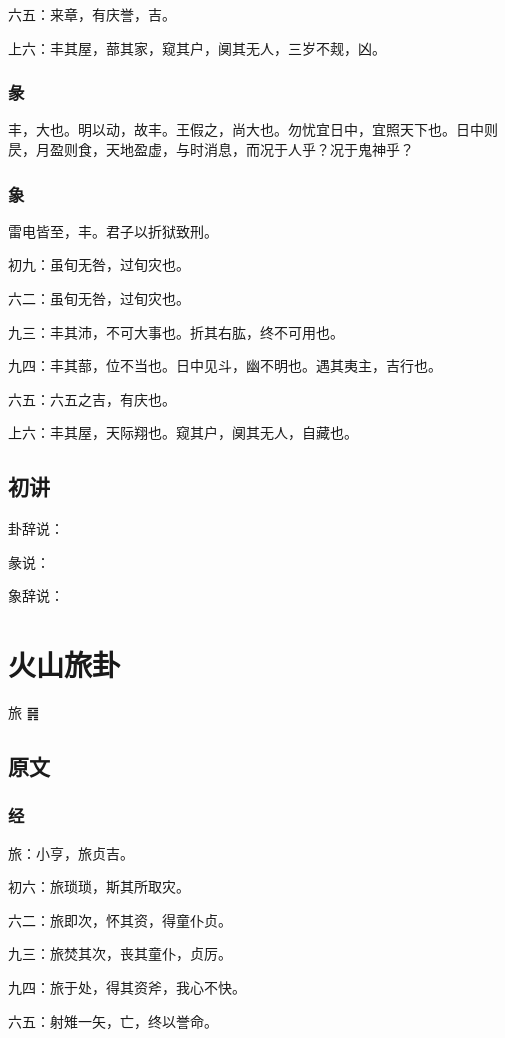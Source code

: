 \documentclass[12pt,oneside]{book}
\begin{document}
六五：来章，有庆誉，吉。

上六：丰其屋，蔀其家，窥其户，阒其无人，三岁不觌，凶。

\subsection{彖}
丰，大也。明以动，故丰。王假之，尚大也。勿忧宜日中，宜照天下也。日中则昃，月盈则食，天地盈虚，与时消息，而况于人乎？况于鬼神乎？

\subsection{象}
雷电皆至，丰。君子以折狱致刑。

初九：虽旬无咎，过旬灾也。

六二：虽旬无咎，过旬灾也。

九三：丰其沛，不可大事也。折其右肱，终不可用也。

九四：丰其蔀，位不当也。日中见斗，幽不明也。遇其夷主，吉行也。

六五：六五之吉，有庆也。

上六：丰其屋，天际翔也。窥其户，阒其无人，自藏也。

\section{初讲}
卦辞说：

彖说：

象辞说：

\chapter{火山旅卦}
旅 {\Large ䷷}


\section{原文}

\subsection{经}
旅：小亨，旅贞吉。

初六：旅琐琐，斯其所取灾。

六二：旅即次，怀其资，得童仆贞。

九三：旅焚其次，丧其童仆，贞厉。

九四：旅于处，得其资斧，我心不快。

六五：射雉一矢，亡，终以誉命。
\end{document}
